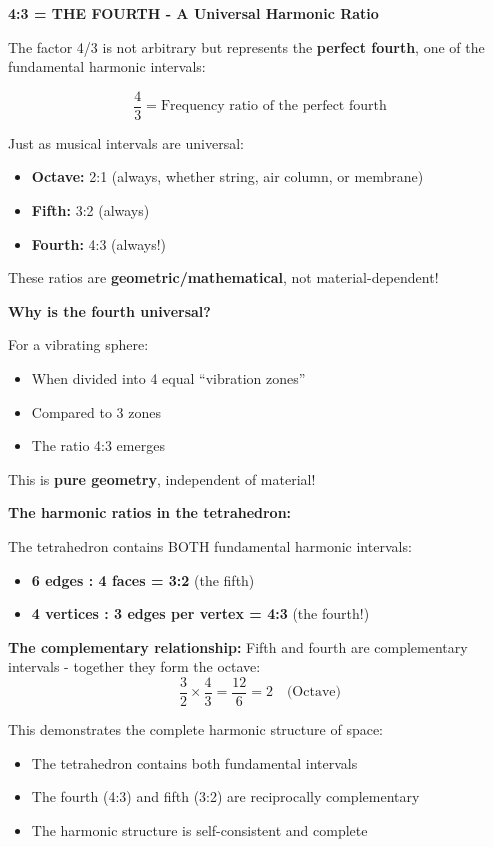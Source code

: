 \documentclass[12pt,a4paper]{report}
\begin{document}
\textbf{4:3 = THE FOURTH - A Universal Harmonic Ratio}

The factor 4/3 is not arbitrary but represents the \textbf{perfect fourth}, one of the fundamental harmonic intervals:

\begin{equation}
	\frac{4}{3} = \text{Frequency ratio of the perfect fourth}
\end{equation}

Just as musical intervals are universal:
\begin{itemize}
	\item \textbf{Octave:} 2:1 (always, whether string, air column, or membrane)
	\item \textbf{Fifth:} 3:2 (always)
	\item \textbf{Fourth:} 4:3 (always!)
\end{itemize}

These ratios are \textbf{geometric/mathematical}, not material-dependent!

\textbf{Why is the fourth universal?}

For a vibrating sphere:
\begin{itemize}
	\item When divided into 4 equal ``vibration zones''
	\item Compared to 3 zones
	\item The ratio 4:3 emerges
\end{itemize}

This is \textbf{pure geometry}, independent of material!

\textbf{The harmonic ratios in the tetrahedron:}

The tetrahedron contains BOTH fundamental harmonic intervals:
\begin{itemize}
	\item \textbf{6 edges : 4 faces = 3:2} (the fifth)
	\item \textbf{4 vertices : 3 edges per vertex = 4:3} (the fourth!)
\end{itemize}

\textbf{The complementary relationship:}
Fifth and fourth are complementary intervals - together they form the octave:
\begin{equation}
	\frac{3}{2} \times \frac{4}{3} = \frac{12}{6} = 2 \quad \text{(Octave)}
\end{equation}

This demonstrates the complete harmonic structure of space:
\begin{itemize}
	\item The tetrahedron contains both fundamental intervals
	\item The fourth (4:3) and fifth (3:2) are reciprocally complementary
	\item The harmonic structure is self-consistent and complete
\end{itemize}
\end{document}
